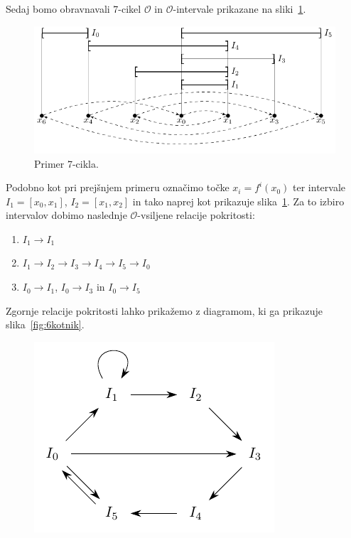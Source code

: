 \documentclass[mat2]{fmfdelo}
\begin{document}
\begin{primer}[7-cikel] \label{primer2}
Sedaj bomo obravnavali 7-cikel $\mathcal{O}$ in $\mathcal{O}$-intervale prikazane na sliki~\ref{fig:7cikel}.
\begin{figure}[h]
  \centering
  \includegraphics{images/sedemcikel.pdf}
  \caption[Primer vektorske slike.]{Primer 7-cikla.}
  \label{fig:7cikel}
\end{figure}
 Podobno kot pri prejšnjem primeru označimo točke $x_i = f^i(x_0)$ ter intervale $I_1 = [x_0, x_1]$, $I_2 = [x_1, x_2]$  in tako naprej kot prikazuje slika~\ref{fig:7cikel}. Za to izbiro intervalov dobimo naslednje $\mathcal{O}$-vsiljene relacije pokritosti:
\begin{enumerate}
\item $I_1 \to I_1$
\item $I_1 \to I_2 \to I_3 \to I_4 \to I_5 \to I_0$
\item $I_0 \to I_1$, $I_0 \to I_3$ in $I_0 \to I_5$
\end{enumerate}
Zgornje relacije pokritosti lahko prikažemo z diagramom, ki ga prikazuje slika~\ref{fig:6kotnik}.
\begin{figure}[h]
  \centering
  \includegraphics{images/graph6.pdf}

\end{figure}
\end{primer}
\end{document}
